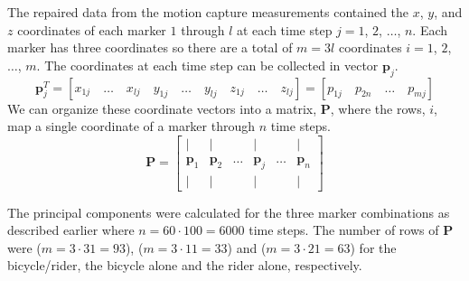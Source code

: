 The repaired data from the motion capture measurements contained the $x$, $y$,
and $z$ coordinates of each marker $1$ through $l$ at each time step $j=1$,
$2$, $\ldots$, $n$. Each marker has three coordinates so there are a total of
$m=3l$ coordinates $i=1$, $2$, $\ldots$, $m$. The coordinates at each time step
can be collected in vector $\mathbf{p}_j$.
\begin{displaymath}
    \mathbf{p}_j^T=\left[x_{1j}\quad\ldots\quad x_{lj}\quad y_{1j}\quad\ldots\quad y_{lj}\quad z_{1j}\quad\ldots\quad z_{lj}\right]=\left[p_{1j}\quad p_{2n}\quad\ldots\quad    p_{mj}\right]
\end{displaymath}
We can organize these coordinate vectors into a matrix, $\mathbf{P}$, where the
rows, $i$, map a single coordinate of a marker through $n$ time steps.
\begin{displaymath}
\mathbf{P}=\left[ \begin{array}{cccccc}
|              & |              &        & |              &        & |             \\
\mathbf{p}_{1} & \mathbf{p}_{2} & \ldots & \mathbf{p}_{j} & \ldots & \mathbf{p}_{n}\\
|              & |              &        & |              &        & |
\end{array} \right]
\end{displaymath}

The principal components were calculated for the three marker combinations as
described earlier where $n=60\cdot100=6000$ time steps. The number of rows of
$\mathbf{P}$ were ($m=3\cdot31=93$), ($m=3\cdot11=33$) and ($m=3\cdot21=63$)
for the bicycle/rider, the bicycle alone and the rider alone, respectively.

